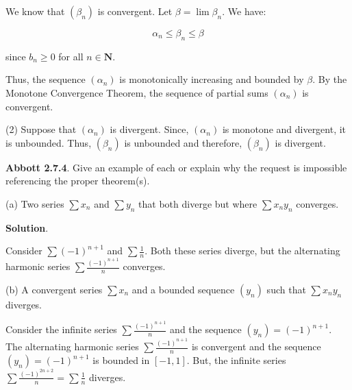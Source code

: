 \documentclass[10pt]{article}
\begin{document}
We know that $\displaystyle ( \beta _{n})$ is convergent. Let $\displaystyle \beta =\lim \beta _{n}$. We have:


\begin{equation*}
\alpha _{n} \leq \beta _{n} \leq \beta 
\end{equation*}


since $\displaystyle b_{n} \geq 0$ for all $\displaystyle n\in \mathbf{N}$.



Thus, the sequence $\displaystyle ( \alpha _{n})$ is monotonically increasing and bounded by $\displaystyle \beta $. By the Monotone Convergence Theorem, the sequence of partial sums $\displaystyle ( \alpha _{n})$ is convergent.



(2) Suppose that $\displaystyle ( \alpha _{n})$ is divergent. Since, $\displaystyle ( \alpha _{n})$ is monotone and divergent, it is unbounded. Thus, $\displaystyle ( \beta _{n})$ is unbounded and therefore, $\displaystyle ( \beta _{n})$ is divergent.



\textbf{Abbott 2.7.4}. Give an example of each or explain why the request is impossible referencing the proper theorem(s).



(a) Two series $\displaystyle \sum x_{n}$ and $\displaystyle \sum y_{n}$ that both diverge but where $\displaystyle \sum x_{n} y_{n}$ converges.



\textbf{Solution}.



Consider $\displaystyle \sum ( -1)^{n+1}$ and $\displaystyle \sum \frac{1}{n}$. Both these series diverge, but the alternating harmonic series $\displaystyle \sum \frac{( -1)^{n+1}}{n}$ converges.



(b) A convergent series $\displaystyle \sum x_{n}$ and a bounded sequence $\displaystyle ( y_{n})$ such that $\displaystyle \sum x_{n} y_{n}$ diverges.



Consider the infinite series $\displaystyle \sum \frac{( -1)^{n+1}}{n}$ and the sequence $\displaystyle ( y_{n}) =( -1)^{n+1}$. The alternating harmonic series $\displaystyle \sum \frac{( -1)^{n+1}}{n}$ is convergent and the sequence $\displaystyle ( y_{n}) =( -1)^{n+1}$ is bounded in $\displaystyle [ -1,1]$. But, the infinite series $\displaystyle \sum \frac{( -1)^{2n+2}}{n} =\sum \frac{1}{n}$ diverges.
\end{document}
